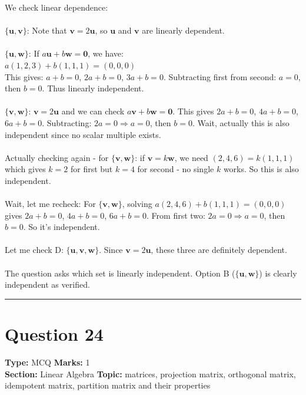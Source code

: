 \documentclass[11pt]{article}
\begin{document}
We check linear dependence:\\
\\
\(\{\mathbf{u}, \mathbf{v}\}\): Note that \(\mathbf{v} = 2\mathbf{u}\), so \(\mathbf{u}\) and \(\mathbf{v}\) are linearly dependent.\\
\\
\(\{\mathbf{u}, \mathbf{w}\}\): If \(a\mathbf{u} + b\mathbf{w} = \mathbf{0}\), we have:\\
\(a(1,2,3) + b(1,1,1) = (0,0,0)\)\\
This gives: \(a + b = 0\), \(2a + b = 0\), \(3a + b = 0\). Subtracting first from second: \(a = 0\), then \(b = 0\). Thus linearly independent.\\
\\
\(\{\mathbf{v}, \mathbf{w}\}\): \(\mathbf{v} = 2\mathbf{u}\) and we can check \(a\mathbf{v} + b\mathbf{w} = \mathbf{0}\). This gives \(2a + b = 0\), \(4a + b = 0\), \(6a + b = 0\). Subtracting: \(2a = 0 \Rightarrow a = 0\), then \(b = 0\). Wait, actually this is also independent since no scalar multiple exists.\\
\\
Actually checking again - for \(\{\mathbf{v}, \mathbf{w}\}\): if \(\mathbf{v} = k\mathbf{w}\), we need \((2,4,6) = k(1,1,1)\) which gives \(k=2\) for first but \(k=4\) for second - no single \(k\) works. So this is also independent.\\
\\
Wait, let me recheck: For \(\{\mathbf{v}, \mathbf{w}\}\), solving \(a(2,4,6) + b(1,1,1) = (0,0,0)\) gives \(2a+b=0\), \(4a+b=0\), \(6a+b=0\). From first two: \(2a=0 \Rightarrow a=0\), then \(b=0\). So it's independent.\\
\\
Let me check D: \(\{\mathbf{u}, \mathbf{v}, \mathbf{w}\}\). Since \(\mathbf{v} = 2\mathbf{u}\), these three are definitely dependent.\\
\\
The question asks which set is linearly independent. Option B (\(\{\mathbf{u}, \mathbf{w}\}\)) is clearly independent as verified.

\vspace{0.8em}
\hrule
\vspace{0.4em}
\section*{Question 24}
\textbf{Type:} MCQ \hfill \textbf{Marks:} 1\\
\textbf{Section:} Linear Algebra \hfill \textbf{Topic:} matrices, projection matrix, orthogonal matrix, idempotent matrix, partition matrix and their properties
\end{document}
